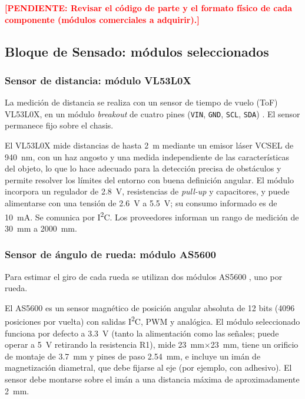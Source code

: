 \documentclass[12pt,a4paper]{article}
\newcommand{\pendiente}[1]{\textcolor{red}{\textbf{[PENDIENTE: #1]}}}
\begin{document}
\pendiente{Revisar el código de parte y el formato físico de cada componente (módulos comerciales a adquirir).}

\subsection{Bloque de Sensado: módulos seleccionados}
\subsubsection{Sensor de distancia: módulo VL53L0X}
La medición de distancia se realiza con un sensor de tiempo de vuelo (ToF) VL53L0X, en un módulo \emph{breakout} de cuatro pines (\texttt{VIN}, \texttt{GND}, \texttt{SCL}, \texttt{SDA}) \cite{vl53mod}. El sensor permanece fijo sobre el chasis.

\begin{visar}
El VL53L0X mide distancias de hasta \SI{2}{m} mediante un emisor láser VCSEL de \SI{940}{nm}, con un haz angosto y una medida independiente de las características del objeto, lo que lo hace adecuado para la detección precisa de obstáculos y permite resolver los límites del entorno con buena definición angular. El módulo incorpora un regulador de \SI{2,8}{V}, resistencias de \emph{pull-up} y capacitores, y puede alimentarse con una tensión de \SI{2,6}{V} a \SI{5,5}{V}; su consumo informado es de \SI{10}{mA}. Se comunica por I\textsuperscript{2}C. Los proveedores informan un rango de medición de \SI{30}{mm} a \SI{2000}{mm}.
\end{visar}

\subsubsection{Sensor de ángulo de rueda: módulo AS5600}
Para estimar el giro de cada rueda se utilizan dos módulos AS5600 \cite{as5600mod}, uno por rueda.

\begin{visar}
El AS5600 es un sensor magnético de posición angular absoluta de 12 bits (4096 posiciones por vuelta) con salidas I\textsuperscript{2}C, PWM y analógica. El módulo seleccionado funciona por defecto a \SI{3,3}{V} (tanto la alimentación como las señales; puede operar a \SI{5}{V} retirando la resistencia R1), mide \SI{23}{mm}$\times$\SI{23}{mm}, tiene un orificio de montaje de \SI{3,7}{mm} y pines de paso \SI{2,54}{mm}, e incluye un imán de magnetización diametral, que debe fijarse al eje (por ejemplo, con adhesivo). El sensor debe montarse sobre el imán a una distancia máxima de aproximadamente \SI{2}{mm}.
\end{visar}
\end{document}
